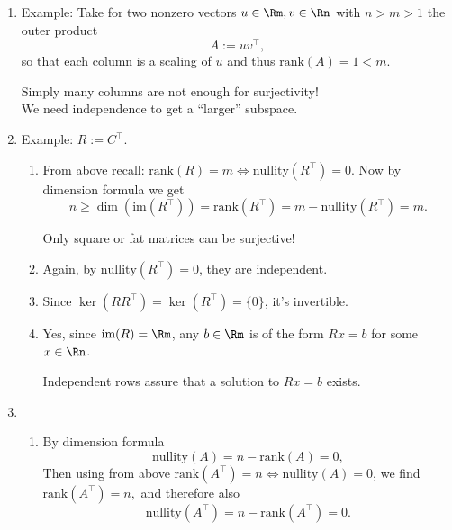 {\begin{enumerate}
\begin{enumerate}
		\item 		No (because $f_C$ injective). Recall the proof: Assume yes, then $Cx_1=b = Cx_2 \iff C(x_1-x_2) = 0 $, where $x_1 -x_2 \neq 0$ due to $x_1\neq x_2$. This contradicts the fact that $\ker(C) = \{0\}$.
		 \begin{center}
			 Independent columns assure that a solution to $Cx = b$ is unique (if it exists).
		\end{center}
				\item Since $\ker(C^\top C) = \ker(C) = \{0\}$, we have that the $(n\times n)$-matrix $C^\top C$ is invertible.
	\end{enumerate}
    
    	\item     Example: Take for two nonzero vectors $u \in \Rm, v \in \Rn$ with $n>m > 1$ the outer product
    $$A := uv^\top, $$
    so that each column is a scaling of $u$ and thus $\text{rank}(A) =1 < m$.
    \begin{center}
    	 Simply many columns are not enough for surjectivity! \\We need independence to get a ``larger'' subspace.
    \end{center}
	\item 	Example: $R := C^\top.$
	\begin{enumerate}
		\item 	From above recall: $\text{rank}(R) = m \iff  \text{nullity}(R^\top) = 0$. Now by dimension formula we get 
				$$n \geq \dim(\text{im}(R^\top))=\text{rank}(R^\top) = m - \text{nullity}(R^\top) = m. $$
		\begin{center}
			 Only square or fat matrices can be surjective!
		\end{center}
		\item 	Again, by $\text{nullity}(R^\top) = 0$, they are independent.
		\item 	Since $\ker(RR^\top )=\ker(R^\top)  = \{0\}$, it's invertible.
		\item  	Yes, since $\text{im}(R) = \Rm$, any $b \in \Rm$ is of the form $Rx = b$ for some $x \in \Rn$.
				 \begin{center}
			 Independent rows assure that a solution to $Rx = b$ exists.
		\end{center}
	\end{enumerate}
		\item 
	\begin{enumerate}
	\item 	By dimension formula 
	$$\text{nullity}(A) = n -  \text{rank}(A) = 0,$$
	Then using from above $\text{rank}(A^\top) = n \iff  \text{nullity}(A) = 0$, we find
	$\text{rank}(A^\top) = n,$
	and therefore also
	$$\text{nullity}(A^\top) = n -  \text{rank}(A^\top) = 0.$$
	

\end{enumerate}
\end{enumerate}}
